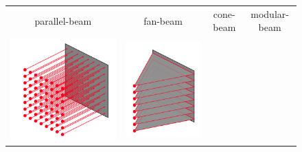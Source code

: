 \documentclass[11pt]{article}
\begin{document}
\begin{figure}[h]
\begin{tabular}{cccc}
parallel-beam & fan-beam & cone-beam & modular-beam \\
\includegraphics[scale=0.26]{parallelBeam}
& \includegraphics[scale=0.28]{fanBeam}

\end{tabular}
\end{figure}
\end{document}
